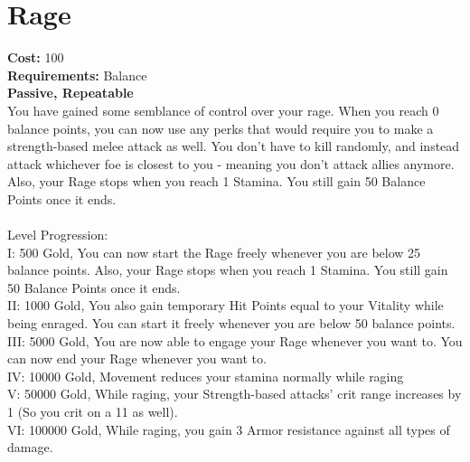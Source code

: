 \section*{Rage}
\textbf{Cost:} 100\\
\textbf{Requirements:} Balance\\
\textbf{Passive, Repeatable}\\
You have gained some semblance of control over your rage. When you reach 0 balance points, you can now use any perks that would require you to make a strength-based melee attack as well. You don't have to kill randomly, and instead attack whichever foe is closest to you - meaning you don't attack allies anymore. Also, your Rage stops when you reach 1 Stamina. You still gain 50 Balance Points once it ends.\\
\\
Level Progression:\\
I: 500 Gold, You can now start the Rage freely whenever you are below 25 balance points. Also, your Rage stops when you reach 1 Stamina. You still gain 50 Balance Points once it ends.\\
II: 1000 Gold, You also gain temporary Hit Points equal to your Vitality while being enraged. You can start it freely whenever you are below 50 balance points.\\
III: 5000 Gold, You are now able to engage your Rage whenever you want to. You can now end your Rage whenever you want to.\\
IV: 10000 Gold, Movement reduces your stamina normally while raging\\
V: 50000 Gold, While raging, your Strength-based attacks' crit range increases by 1 (So you crit on a 11 as well).\\
VI: 100000 Gold, While raging, you gain 3 Armor resistance against all types of damage.